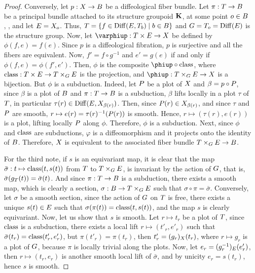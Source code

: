 \begin{proof}
  Conversely,
  let $p : \X \to \B$ be a diffeological fiber bundle.
  Let $\pi : \T \to \B$ be a principal bundle attached to its structure groupoid $\KK$,
  at some point $\eo \in \B$ ,
  ,
  and let $\E = \X_\eo$.
  Thus, $\T = \{ f \in \Diff(\E, \T_b) \mid b \in \B \}$ and $\G = \T_\eo = \Diff(\E)$ is the structure group.
  Now,
  let $\phi : \T \times \E \to \X$ be defined by $\phi(f,e) = f(e)$.
  Since $p$ is a diffeological fibration,
  $p$ is surjective and all the fibers are equivalent.
  Now,
  $f' = f \circ g^{-1}$ and $e' = g(e)$ if and only if $\phi(f,e) = \phi(f',e')$.
  Then,
  $\phi$ is the composite $\varphi \circ \class$,
  where $\class : \T \times \E \to \T \times_\G \E$ is the projection,
  and $\varphi : \T \times_\G \E \to \X$ is a bijection.
  But $\phi$ is a subduction.
  Indeed,
  let $\P$ be a plot of $\X$ and $\beta = p \circ \P$,
  since $\beta$ is a plot of $\B$ and $\pi : \T \to \B$ is a subduction,
  $\beta$ lifts locally in a plot $\tau$ of $\T$,
  in particular $\tau(r) \in \Diff(\E,\X_{\beta(r)})$.
  Then,
  since $\P(r) \in \X_{\beta(r)}$,
  and since $\tau$ and $\P$ are smooth,
  $r \mapsto e(r) = \tau(r)^{-1}(\P(r))$ is smooth.
  Hence, $r \mapsto (\tau(r),e(r))$ is a plot,
  lifting locally $\P$  along $\phi$.
  Therefore,
  $\phi$ is a subduction.
  Next,
  since $\phi$ and $\class$ are subductions,
  $\varphi$ is a diffeomorphism and it projects onto the identity of $\B$.
  Therefore,
  $\X$ is equivalent to the associated fiber bundle $\T \times_\G \E \to \B$.
  
  For the third note,
  if $s$ is an equivariant map,
  it is clear that the map $\bar\sigma : t \mapsto \class(t,s(t))$ from $\T$ to $\T \times_\G \E$,
  is invariant by the action of $\G$,
  that is,
  $\bar\sigma(g_\T(t)) = \bar\sigma(t)$.
  And since $\pi : \T \to \B$ is a subduction, there exists a smooth map,
  which is clearly a section,
  $\sigma : \B \to \T \times_\G \E$ such that $\sigma \circ \pi = \bar\sigma$.
  Conversely,
  let $\sigma$ be a smooth section,
  since the action of $\G$ on $\T$ is free,
  there exists a unique $s(t) \in \E$ such that $\sigma(\pi(t)) = \class(t,s(t))$,
  and the map $s$ is clearly equivariant.
  Now,
  let us show that $s$ is smooth.
  Let $r \mapsto t_r$ be a plot of $\T$,
  since $\class$ is a subduction,
  there exists a local lift $r \mapsto (t'_r,e'_r)$ such that $\bar\sigma(t_r) = \class(t'_r,e'_r)$,
  but $\pi(t'_r) = \pi(t_r)$,
  then $t'_r = (g_r)_\X(t_r)$,
  where $r \mapsto g_r$ is a plot of $\G$,
  because $\pi$ is locally trivial along the plots.
  Now,
  let
  $e_r = (g_r^{-1})_\E(e'_r)$,
  then $r \mapsto (t_r,e_r)$ is another smooth local lift of $\bar\sigma$,
  and by unicity $e_r = s(t_r)$,
  hence $s$ is smooth.
\end{proof}

